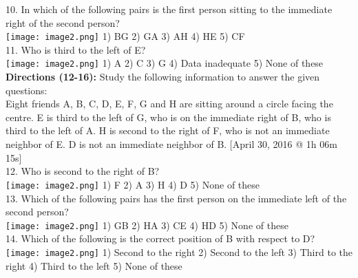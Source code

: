 \documentclass[
]{article}
\begin{document}
10. In which of the following pairs is the first person sitting to the immediate right of the second
person?\\
\texttt{[image: image2.png]}
1) BG \hspace{2mm}2) GA \hspace{2mm}3) AH \hspace{2mm}4) HE \hspace{2mm}5) CF\\

11. Who is third to the left of E?\\
\texttt{[image: image2.png]}
1) A \hspace{2mm}2) C \hspace{2mm}3) G
\hspace{2mm}4) Data inadequate \hspace{2mm}5) None of these\\

\textbf{Directions (12-16):} Study the following information to answer the given questions:\\
Eight friends A, B, C, D, E, F, G and H are sitting around a circle facing the centre. E is third to
the left of G, who is on the immediate right of B, who is third to the left of A. H is second to the
right of F, who is not an immediate neighbor of E. D is not an immediate neighbor of B.
[April 30, 2016 @ 1h 06m 15s]\\

12. Who is second to the right of B?\\
\texttt{[image: image2.png]}
1) F \hspace{2mm}2) A \hspace{2mm}3) H \hspace{2mm}4) D \hspace{2mm}5) None of these\\

13. Which of the following pairs has the first person on the immediate left of the second person?\\
\texttt{[image: image2.png]}
1) GB \hspace{2mm}2) HA \hspace{2mm}3) CE \hspace{2mm}4) HD \hspace{2mm}5) None of these\\

14. Which of the following is the correct position of B with respect to D?\\
\texttt{[image: image2.png]}
1) Second to the right \hspace{2mm}2) Second to the left \hspace{2mm}3) Third to the right
\hspace{2mm}4) Third to the left \hspace{2mm}5) None of these\\
\end{document}
